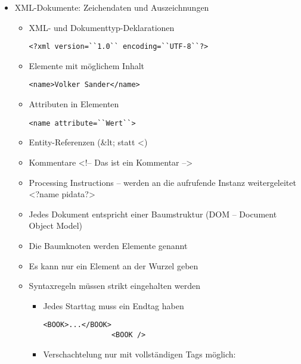 \begin{itemize}
    \item XML-Dokumente: Zeichendaten und Auszeichnungen
    \begin{itemize}
        \item XML- und Dokumenttyp-Deklarationen
        \lstset{language=XML}
        \begin{lstlisting}[label={lst:lstlisting}]
            <?xml version=``1.0`` encoding=``UTF-8``?>
        \end{lstlisting}
        \item Elemente mit möglichem Inhalt \lstset{language=XML}
        \begin{lstlisting}[label={lst:lstlisting2}]
            <name>Volker Sander</name>
        \end{lstlisting}
        \item Attributen in Elementen
        \lstset{language=XML}
        \begin{lstlisting}[label={lst:lstlisting3}]
            <name attribute=``Wert``>
        \end{lstlisting}
        \item Entity-Referenzen (\&lt; statt <)
        \item Kommentare \linebreak
        <!– Das ist ein Kommentar -->
        \item Processing Instructions – werden an die aufrufende Instanz weitergeleitet \linebreak
        <?name pidata?>
        \item Jedes Dokument entspricht einer Baumstruktur (DOM – Document Object Model)
        \item Die Baumknoten werden Elemente genannt
        \item Es kann nur ein Element an der Wurzel geben
        \item Syntaxregeln müssen strikt eingehalten werden
        \begin{itemize}
            \item Jedes Starttag muss ein Endtag haben
            \lstset{language=XML}
            \begin{lstlisting}[label={lst:lstlisting4}]
                <BOOK>...</BOOK>
                <BOOK />
            \end{lstlisting}
            \item Verschachtelung nur mit vollständigen Tags möglich:

\end{itemize}
\end{itemize}
\end{itemize}
